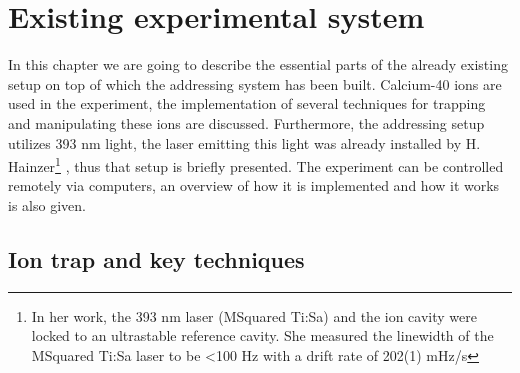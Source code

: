 
\chapter{Existing experimental system}
In this chapter we are going to describe the essential parts of the already existing setup on top of which the addressing system has been built. Calcium-40 ions are used in the experiment, the implementation of several techniques for trapping and manipulating these ions are discussed. Furthermore, the addressing setup utilizes 393 nm light, the laser emitting this light was already installed by H. Hainzer\footnote{In her work, the 393 nm laser (MSquared Ti:Sa) and the ion cavity were locked to an ultrastable reference cavity. She measured the linewidth of the MSquared Ti:Sa laser to be <100 Hz with a drift rate of 202(1) mHz/s} \cite{helene}, thus that setup is briefly presented. The experiment can be controlled remotely via computers, an overview of how it is implemented and how it works is also given.

\section{Ion trap and key techniques}
